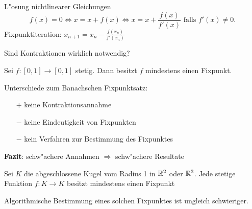 \documentclass[a4paper,10pt]{article}
\begin{document}
L"osung nichtlinearer Gleichungen
\[
 f(x)=0 \Leftrightarrow x = x + f(x) \Leftrightarrow 
 x = x + \frac{f(x)}{f'(x)} \text{ falls } f'(x)\neq0.
\]
Fixpunktiteration: $x_{n+1} = x_n - \frac{f(x_n)}{f'(x_n)}$

Sind Kontraktionen wirklich notwendig?

\begin{thrm*}
 Sei $f:\left[ 0, 1\right] \to \left[ 0, 1\right]$ stetig. Dann besitzt $f$ mindestens 
 einen Fixpunkt.
\end{thrm*}

\noindent
Unterschiede zum Banachschen Fixpunktsatz:
\begin{itemize}
 \item[$+$] keine Kontraktionsannahme
 \item[$-$] keine Eindeutigkeit von Fixpunkten
 \item[$-$] kein Verfahren zur Bestimmung des Fixpunktes
\end{itemize}

\noindent
\textbf{Fazit}: schw"achere Annahmen $\Rightarrow$ schw"achere Resultate

\begin{thrm*}
 Sei $K$ die abgeschlossene Kugel vom Radius 1 in $\mathbb{R}^2$ oder $\mathbb{R}^3$. Jede stetige
 Funktion $f:K \to K$ besitzt mindestens einen Fixpunkt
\end{thrm*}

Algorithmische Bestimmung eines solchen Fixpunktes ist ungleich schwieriger.
\end{document}
